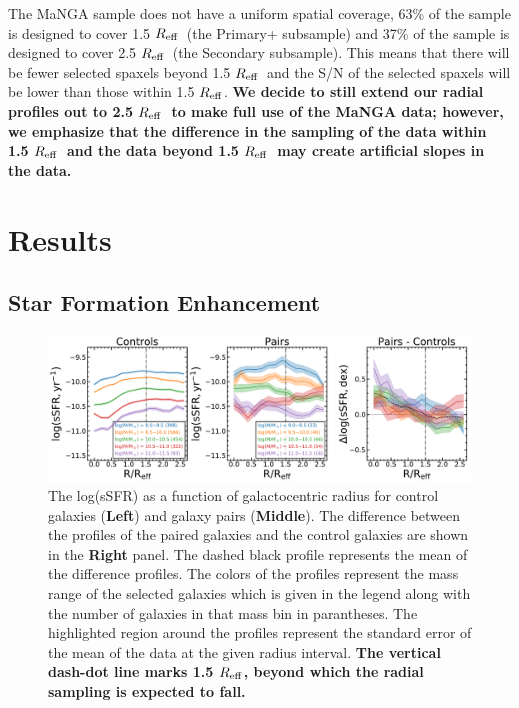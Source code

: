 \documentclass[apj,twocolumn]{emulateapj}
\newcommand{\reff}{$R_{\rm eff}$}
\begin{document}
\begin{CJK*}{UTF8}{gbsn}
The MaNGA sample does not have a uniform spatial coverage, 63\% of the sample is designed to cover 1.5 \reff\ (the Primary+ subsample) and 37\% of the sample is designed to cover 2.5 \reff\ (the Secondary subsample). This means that there will be fewer selected spaxels beyond 1.5 \reff\ and the S/N of the selected spaxels will be lower than those within 1.5 \reff. {\bf We decide to still extend our radial profiles out to 2.5 \reff\ to make full use of the MaNGA data; however, we emphasize that the difference in the sampling of the data within 1.5 \reff\ and the data beyond 1.5 \reff\ may create artificial slopes in the data. }


\section{Results}\label{sec:results}

\subsection{Star Formation Enhancement}

\begin{figure}
\centering
\includegraphics[width=\linewidth]{ssfr_comb.pdf}
\caption[]{The log(sSFR) as a function of galactocentric radius for control galaxies (\textbf{Left}) and galaxy pairs (\textbf{Middle}). The difference between the profiles of the paired galaxies and the control galaxies are shown in the \textbf{Right} panel. The dashed black profile represents the mean of the difference profiles. The colors of the profiles represent the mass range of the selected galaxies which is given in the legend along with the number of galaxies in that mass bin in parantheses. The highlighted region around the profiles represent the standard error of the mean of the data at the given radius interval. {\bf The vertical dash-dot line marks 1.5 \reff, beyond which the radial sampling is expected to fall.}}
\label{fig:ssfr_prof}
\end{figure}


\end{CJK*}
\end{document}
